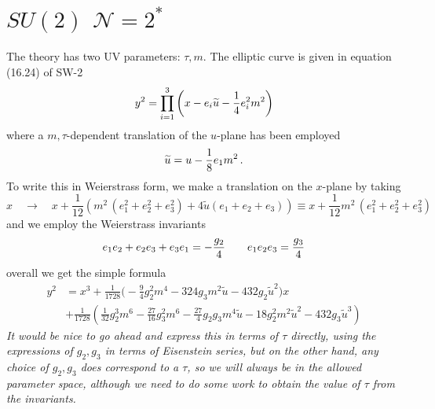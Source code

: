 \documentclass[11pt]{article}
\def\CN{{\mathcal{N}}}
\newcommand{\be}{\begin{equation}}
\newcommand{\ee}{\end{equation}}
\begin{document}
\section{$SU(2)$ $\CN=2^{*}$}
The theory has two UV parameters: $\tau, m$.
The elliptic curve is given in equation (16.24) of SW-2
\be
	y^{2} = \prod_{i=1}^{3}\left(  x - e_{i} \widetilde u -{1\over 4} e_{i}^{2} m^{2}  \right)
\ee
where a $m,\tau$-dependent translation of the $u$-plane has been employed
\be
	\widetilde u = u - {1\over 8} e_{1} m^{2}\,.
\ee
To write this in Weierstrass form, we make a translation on the $x$-plane by taking
\be
	x\quad \to\quad x + \frac{1}{12} \left( m^{2} \, (e_{1}^{2} +e_{2}^{2} + e_{3}^{2}) + 4  \widetilde{u} (e_{1}+e_{2}+e_{3})\right) \equiv x + \frac{1}{12}  m^{2} \, (e_{1}^{2} +e_{2}^{2} + e_{3}^{2})
\ee
and we employ the Weierstrass invariants
\be
	e_{1}e_{2}+e_{2}e_{3}+e_{3}e_{1} = -{g_{2}\over 4}\qquad e_{1}e_{2}e_{3} = {g_{3}\over 4}
\ee 
overall we get the simple formula
\be
\begin{split}
	y^{2} &=  x^{3} + \frac{1}{1728} \big(-\frac{9}{4} g_2^2 m^4-324 g_3 m^2 \widetilde{u}-432 g_2 \widetilde{u}^2\big) x\\
	& +\frac{1}{1728}\left(\frac{1}{32} g_2^3 m^6-\frac{27}{16} g_3^2 m^6-\frac{27}{4} g_2 g_3 m^4 \widetilde{u}-18 g_2^2 m^2 \widetilde{u}^2-432 g_3 \widetilde{u}^3\right)
\end{split}
\ee
\emph{It would be nice to go ahead and express this in terms of $\tau$ directly, using the expressions of $g_{2}, g_{3}$ in terms of Eisenstein series, but on the other hand, any choice of $g_{2}, g_{3}$ does correspond to a $\tau$, so we will always be in the allowed parameter space, although we need to do some work to obtain the value of $\tau$ from the invariants.}
\end{document}
